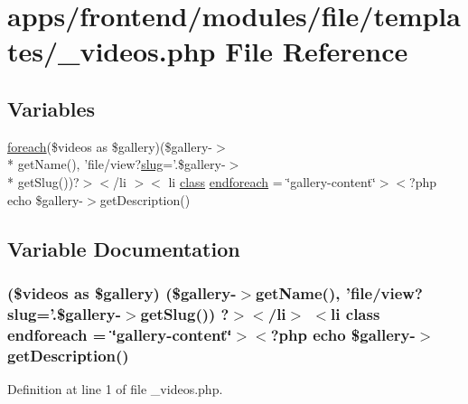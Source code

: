\hypertarget{frontend_2modules_2file_2templates_2__videos_8php}{\section{apps/frontend/modules/file/templates/\-\_\-videos.php File Reference}
\label{frontend_2modules_2file_2templates_2__videos_8php}
}
\subsection*{Variables}
\begin{DoxyCompactItemize}
\item 
\hyperlink{presse_2modules_2news_2templates_2index_success_8php_abc56db52b2e9a59bcd5c9e45ac5cb332}{foreach}(\$videos as \$gallery)(\$gallery-\/$>$\\*
get\-Name(), 'file/view?\hyperlink{backend_2modules_2ipn_2templates_2view_success_8php_a2b7d6694be020169de3a660b1b93a40d}{slug}='.\$gallery-\/$>$\\*
get\-Slug())?$>$$<$/li $>$$<$ li \hyperlink{live_2modules_2news_2templates_2__actualitelight_8php_a185c73c6507391d1eb38c776b68ce96d}{class} \hyperlink{frontend_2modules_2file_2templates_2__videos_8php_ab2b1e42e113e7c347af37a574b516a10}{endforeach} = \char`\"{}gallery-\/content\char`\"{}$>$$<$?php echo \$gallery-\/$>$get\-Description()
\end{DoxyCompactItemize}


\subsection{Variable Documentation}
\hypertarget{frontend_2modules_2file_2templates_2__videos_8php_ab2b1e42e113e7c347af37a574b516a10}{
\subsubsection[{endforeach}]{ (\$videos as \$gallery) (\$gallery-\/$>$get\-Name(), 'file/view?{\bf slug}='.\$gallery-\/$>$get\-Slug()) ?$>$$<$/li$>$ $<$li {\bf class} endforeach = \char`\"{}gallery-\/content\char`\"{}$>$$<$?php echo \$gallery-\/$>$get\-Description()}}\label{frontend_2modules_2file_2templates_2__videos_8php_ab2b1e42e113e7c347af37a574b516a10}


Definition at line 1 of file \-\_\-videos.\-php.

